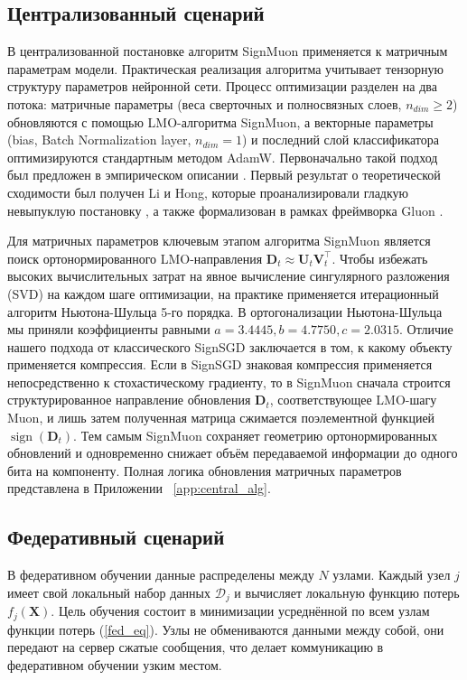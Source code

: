 \documentclass{article}
\begin{document}
\subsection{Централизованный сценарий}
В централизованной постановке алгоритм SignMuon применяется к матричным параметрам модели. Практическая реализация алгоритма учитывает тензорную структуру параметров нейронной сети. Процесс оптимизации разделен на два потока: матричные параметры (веса сверточных и полносвязных слоев, $n_{dim} \ge 2$) обновляются с помощью LMO-алгоритма SignMuon, а векторные параметры (bias, Batch Normalization layer, $n_{dim} = 1$) и последний слой классификатора оптимизируются стандартным методом AdamW. Первоначально такой подход был предложен в эмпирическом описании \cite{jordan2024muon}. Первый результат о теоретической сходимости был получен Li и Hong, которые проанализировали гладкую невыпуклую постановку \cite{li2025note}, а также формализован в рамках фреймворка Gluon \cite{riabinin2025gluon}.

Для матричных параметров ключевым этапом алгоритма SignMuon является поиск ортонормированного LMO-направления $\mathbf{D}_t \approx \mathbf{U}_t \mathbf{V}_t^\top$. Чтобы избежать высоких вычислительных затрат на явное вычисление сингулярного разложения (SVD) на каждом шаге оптимизации, на практике применяется итерационный алгоритм Ньютона-Шульца 5-го порядка. В ортогонализации Ньютона-Шульца мы приняли коэффициенты равными $a=3.4445, b=4.7750, c=2.0315$. Отличие нашего подхода от классического SignSGD заключается в том, к какому объекту применяется компрессия. Если в SignSGD знаковая компрессия применяется непосредственно к стохастическому градиенту, то в SignMuon сначала строится структурированное направление обновления $\mathbf{D}_t$, соответствующее LMO-шагу Muon, и лишь затем полученная матрица сжимается поэлементной функцией $\operatorname{sign}(\mathbf{D}_t)$. Тем самым SignMuon сохраняет геометрию ортонормированных обновлений и одновременно снижает объём передаваемой информации до одного бита на компоненту. Полная логика обновления матричных параметров представлена в Приложении ~\ref{app:central_alg}.

\subsection{Федеративный сценарий}
В федеративном обучении данные распределены между $N$ узлами. Каждый узел $j$ имеет свой локальный набор данных $\mathcal{D}_j$ и вычисляет локальную функцию потерь $f_j(\mathbf{X})$. Цель обучения состоит в минимизации усреднённой по всем узлам функции потерь (\ref{fed_eq}). Узлы не обмениваются данными между собой, они передают на сервер сжатые сообщения, что делает коммуникацию в федеративном обучении узким местом.
\end{document}
